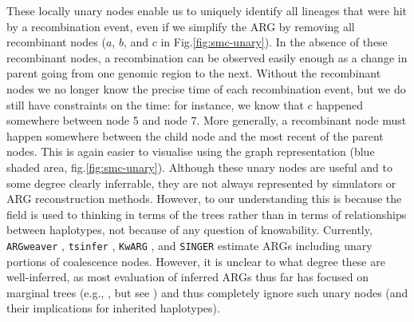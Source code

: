\documentclass{article}
\newcommand{\tsinfer}[0]{\texttt{tsinfer}}
\newcommand{\kwarg}[0]{\texttt{KwARG}}
\newcommand{\argweaver}[0]{\texttt{ARGweaver}}
\begin{document}

These locally unary nodes enable
us to uniquely identify all lineages that were hit by a recombination event,
even if we simplify the ARG by removing all recombinant nodes
($a$, $b$, and $c$ in Fig.\ref{fig:smc-unary}).
In the absence of these recombinant nodes, a recombination can be observed
easily enough as a change in parent going from one genomic region to the next.
Without the recombinant nodes we no longer know the precise time of each recombination event,
but we do still have constraints on the time:
for instance, we know that $c$ happened somewhere between node 5 and node 7.
More generally, a recombinant node must happen somewhere between the child node
and the most recent of the parent nodes.
This is again easier to visualise using the
graph representation (blue shaded area, fig.\ref{fig:smc-unary}).
Although these unary nodes are useful and to some degree clearly inferrable,
they are not always represented by simulators or ARG reconstruction methods.
However, to our understanding this is because
the field is used to thinking in terms of the trees
rather than in terms of relationships between haplotypes,
not because of any question of knowability.
Currently,
\argweaver{} \citep{rasmussen_genome-wide_2014},
\tsinfer{} \citep{kelleher_inferring_2019},
\kwarg{} \citep{ignatieva_kwarg_2021}, and
\texttt{SINGER} \citep{deng2024robust} estimate ARGs 
including unary portions of coalescence nodes.
However, it is unclear to what degree these are well-inferred,
as most evaluation of inferred ARGs thus far has focused on marginal trees
(e.g., \citet{brandt2022evaluation, kelleher_inferring_2019},
but see \citet{deng2021distribution})
and thus completely ignore such unary nodes
(and their implications for inherited haplotypes).
\end{document}

